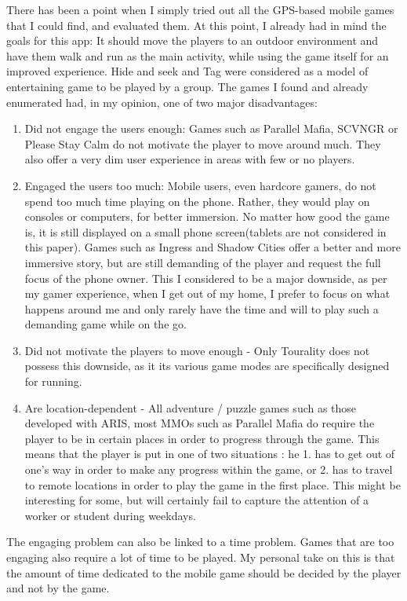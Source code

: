 \documentclass{article}
\begin{document}
There has been a point when I simply tried out all the GPS-based mobile games
that I could find, and evaluated them. At this point, I already had in mind the
goals for this app: It should move the players to an outdoor environment and
have them walk and run as the main activity, while using the game itself for
an improved experience. Hide and seek and Tag were considered as a model of
entertaining game to be played by a group. The games I found and already
enumerated had, in my opinion, one of two major disadvantages:
\begin{enumerate}
  \item Did not engage the users enough: Games such as Parallel Mafia, SCVNGR or
  Please Stay Calm do not motivate the player to move around much. They also
  offer a very dim user experience in areas with few or no players.
  \item Engaged the users too much: Mobile users, even hardcore gamers, do not
  spend too much time playing on the phone. Rather, they would play on consoles
  or computers, for better immersion. No matter how good the game is, it is
  still displayed on a small phone screen(tablets are not considered in this
  paper). Games such as Ingress and Shadow Cities offer a better and more
  immersive story, but are still demanding of the player and request the full
  focus of the phone owner. This I considered to be a major downside, as per my
  gamer experience, when I get out of my home, I prefer to focus on what happens
  around me and only rarely have the time and will to play such a demanding game
  while on the go. 
  \item Did not motivate the players to move enough - Only Tourality does not
  possess this downside, as it its various game modes are specifically designed
  for running.
  \item Are location-dependent - All adventure / puzzle games such as those
  developed with ARIS, most MMOs such as Parallel Mafia do require the player to
  be in certain places in order to progress through the game. This means that
  the player is put in one of two situations : he 1. has to get out of
  one's way in order to make any progress within the game, or 2. has to travel
  to remote locations in order to play the game in the first place. This might
  be interesting for some, but will certainly fail to capture the attention of a
  worker or student during weekdays.
\end{enumerate}

The engaging problem can also be linked to a time problem. Games that are too
engaging also require a lot of time to be played. My personal take on this is
that the amount of time dedicated to the mobile game should be decided by the
player and not by the game. \newline
\end{document}
